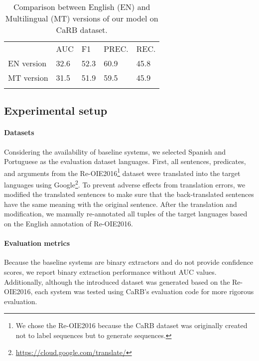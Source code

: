 \documentclass[11pt,a4paper]{article}
\begin{document}
\begin{table}[t]
\centering
\begin{tabularx}{\columnwidth}{l|YYYY}
                  & AUC  & F1   & PREC. & REC. \\ 
\small EN version & 32.6 & 52.3 & 60.9  & 45.8 \\
\small MT version & 31.5 & 51.9 & 59.5  & 45.9 \\
\end{tabularx}
\caption
{
Comparison between English (EN) and Multilingual (MT) versions of our model on CaRB dataset.
}
\label{tab:6}
\end{table}

\subsection{Experimental setup}
\paragraph{Datasets}
Considering the availability of baseline systems, we selected Spanish and Portuguese as the evaluation dataset languages.
First, all sentences, predicates, and arguments from the Re-OIE2016\footnote{We chose the Re-OIE2016 because the CaRB dataset was originally created not to label sequences but to generate sequences.} dataset were translated into the target languages using Google\footnote{\url{https://cloud.google.com/translate/}}.
To prevent adverse effects from translation errors, we modified the translated sentences to make sure that the back-translated sentences have the same meaning with the original sentence.
After the translation and modification, we manually re-annotated all tuples of the target languages based on the English annotation of Re-OIE2016.

\paragraph{Evaluation metrics}
Because the baseline systems are binary extractors and do not provide confidence scores, we report binary extraction performance without AUC values.
Additionally, although the introduced dataset was generated based on the Re-OIE2016, each system was tested using CaRB's evaluation code for more rigorous evaluation.
\end{document}
